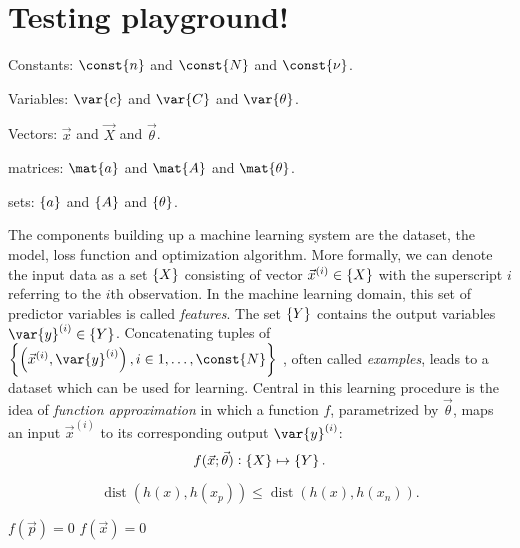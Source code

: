 \documentclass[fontsize=11pt,open=right,numbers=noenddot,]{scrbook} %
\begin{document}
\chapter{Testing playground!} \label{ch:fsds}

Constants: $\const{n}$ and $\const{N}$ and $\const{\nu}$.

Variables: $\var{c}$ and $\var{C}$ and $\var{\theta}$.

Vectors: $\vec{x}$ and $\vec{X}$ and $\vec{\theta}$.

matrices: $\mat{a}$ and $\mat{A}$ and $\mat{\theta}$.

sets: $\set{a}$ and $\set{A}$ and $\set{\theta}$.


The components building up a machine learning system are the dataset, the model, loss function and optimization algorithm.
More formally, we can denote the input data as a set $\set{X}$ consisting of vector $\vec{x}^{(i)} \in \set{X} $ with the superscript $i$ referring to the $i$th observation. In the machine learning domain, this set of predictor variables is called \textit{features}. The set $\set{Y}$ contains the output variables $\var{y}^{(i)} \in \set{Y}$. Concatenating tuples of
$\left\{\left(\vec{x}^{(i)}, \var{y}^{(i)}\right) , i \in 1,\dots,\const{N} \right\}$
, often called \textit{examples}, leads to a dataset which can be used for learning. Central in this learning procedure is the idea of \textit{function approximation} in which a function $f$, parametrized by $\vec{\theta}$, maps an input $\vec{x}^{(i)}$ to its corresponding output $\var{y}^{(i)}$:
\begin{equation*}
	f(\vec{x};\vec{\theta}): \set{X} \mapsto \set{Y}\text{.}
\end{equation*}



\begin{equation*}
	\operatorname{dist}{\left( h(x),h(x_p) \right)} \leq \operatorname{dist}{\left( h(x),h(x_n) \right)} .
\end{equation*}


$f(\vec{p}) = 0$
$f(\vec{x}) = 0$
\end{document}
